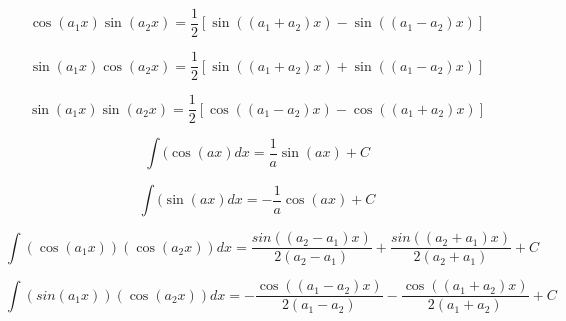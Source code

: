 \documentclass[12pt]{article}
\begin{document}
\begin{equation}
\label{cos sin additional}
\cos(a_1x)\sin(a_2x) = \frac{1}{2}[\sin((a_1+a_2)x) - \sin((a_1-a_2)x)]
\end{equation}

\begin{equation}
\label{sin cos additional}
\sin(a_1x)\cos(a_2x) = \frac{1}{2}[\sin((a_1+a_2)x) + \sin((a_1-a_2)x)]
\end{equation}

\begin{equation}
\label{sin sin additional}
\sin(a_1x)\sin(a_2x) = \frac{1}{2}[\cos((a_1-a_2)x) - \cos((a_1+a_2)x)]
\end{equation}

\begin{equation}
\label{integral cos}
\int (\cos(ax)dx = \frac{1}{a}\sin(ax) + C
\end{equation}

\begin{equation}
\label{integral sin}
\int (\sin(ax)dx = -\frac{1}{a}\cos(ax) + C
\end{equation}

\begin{equation}
\label{integral cos cos additional}
\int (\cos(a_1x))(\cos(a_2x))dx = \frac{sin((a_2-a_1)x)}{2(a_2-a_1)} + \frac{sin((a_2+a_1)x)}{2(a_2+a_1)} + C 
\end{equation}

\begin{equation}
\label{integral cos sin additional}
\int (sin(a_1x))(\cos(a_2x))dx = -\frac{\cos((a_1-a_2)x)}{2(a_1-a_2)} - \frac{\cos((a_1+a_2)x)}{2(a_1+a_2)} + C 
\end{equation}
\end{document}
